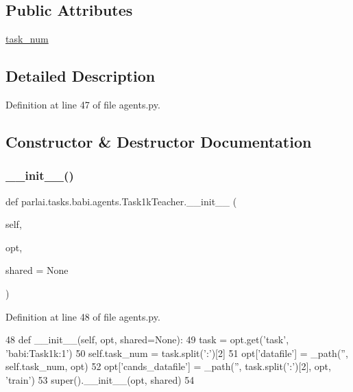 \subsection*{Public Attributes}
\begin{DoxyCompactItemize}
\item 
\hyperlink{classparlai_1_1tasks_1_1babi_1_1agents_1_1Task1kTeacher_a0c153d5823837de445669016a18540e7}{task\+\_\+num}
\end{DoxyCompactItemize}


\subsection{Detailed Description}


Definition at line 47 of file agents.\+py.



\subsection{Constructor \& Destructor Documentation}
\mbox{\label{classparlai_1_1tasks_1_1babi_1_1agents_1_1Task1kTeacher_a61a5955ca556265eaf2e47a33c80ef09}} 
\subsubsection{\texorpdfstring{\+\_\+\+\_\+init\+\_\+\+\_\+()}{\_\_init\_\_()}}
{\footnotesize\ttfamily def parlai.\+tasks.\+babi.\+agents.\+Task1k\+Teacher.\+\_\+\+\_\+init\+\_\+\+\_\+ (\begin{DoxyParamCaption}\item[{}]{self,  }\item[{}]{opt,  }\item[{}]{shared = {\ttfamily None} }\end{DoxyParamCaption})}



Definition at line 48 of file agents.\+py.


\begin{DoxyCode}
48     \textcolor{keyword}{def }\_\_init\_\_(self, opt, shared=None):
49         task = opt.get(\textcolor{stringliteral}{'task'}, \textcolor{stringliteral}{'babi:Task1k:1'})
50         self.task\_num = task.split(\textcolor{stringliteral}{':'})[2]
51         opt[\textcolor{stringliteral}{'datafile'}] = \_path(\textcolor{stringliteral}{''}, self.task\_num, opt)
52         opt[\textcolor{stringliteral}{'cands\_datafile'}] = \_path(\textcolor{stringliteral}{''}, task.split(\textcolor{stringliteral}{':'})[2], opt, \textcolor{stringliteral}{'train'})
53         super().\_\_init\_\_(opt, shared)
54 
\end{DoxyCode}


